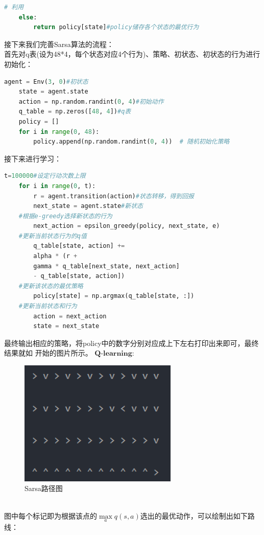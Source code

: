 \documentclass[answers]{exam}  %
\begin{document}
\begin{questions}
\begin{lstlisting}[language={Python}]
    # 利用
    else:
        return policy[state]#policy储存各个状态的最优行为
\end{lstlisting}
接下来我们完善Sarsa算法的流程：\\
首先对q表(设为48*4，每个状态对应4个行为)、策略、初状态、初状态的行为进行初始化：
\begin{lstlisting}[language={Python}]
    agent = Env(3, 0)#初状态
    state = agent.state
    action = np.random.randint(0, 4)#初始动作
    q_table = np.zeros([48, 4])#q表
    policy = []
    for i in range(0, 48):
        policy.append(np.random.randint(0, 4))  # 随机初始化策略
\end{lstlisting}
\newpage
接下来进行学习：
\begin{lstlisting}[language={Python}]
	t=100000#设定行动次数上限
    for i in range(0, t):
        r = agent.transition(action)#状态转移，得到回报
        next_state = agent.state#新状态
	#根据e-greedy选择新状态的行为
        next_action = epsilon_greedy(policy, next_state, e)
	#更新当前状态行为的q值
        q_table[state, action] += 
		alpha * (r + 
		gamma * q_table[next_state, next_action] 
		- q_table[state, action])
	#更新该状态的最优策略
        policy[state] = np.argmax(q_table[state, :])
	#更新当前状态和行为
        action = next_action
        state = next_state
\end{lstlisting}
最终输出相应的策略，将policy中的数字分别对应成上下左右打印出来即可，最终结果就如
开始的图片所示。
\newpage
		${\textbf{Q-learning}}:$\\
		\begin{figure}[h]
			\centering
			\includegraphics[width=0.7\linewidth,height=6cm]{problem3-code/q-learning.png}
			\caption{Sarsa路径图}
		\end{figure}
		~\\
		图中每个标记即为根据该点的$\max\limits_{a}q(s,a)$选出的最优动作，可以绘制出如下路线：	
		\begin{figure}[h]
			\centering

\end{figure}
\end{questions}
\end{document}

